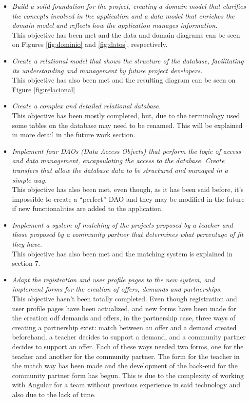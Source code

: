 \documentclass[11pt]{book}
\begin{document}
\begin{itemize}
	\item \emph{Build a solid foundation for the project, creating a domain model that clarifies the concepts involved in the application and a data model that enriches the domain model and reflects how the application manages information.}\\
This objective has been met and the data and domain diagrams can be seen on Figures  \ref{fig:dominio} and \ref{fig:datos}, respectively.
	\item \emph{Create a relational model that shows the structure of the database, facilitating its understanding and management by future project developers.}\\
This objective has also been met and the resulting diagram can be seen on Figure \ref{fig:relacional}
	\item \emph{Create a complex and detailed relational database.}\\
This objective has been mostly completed, but, due to the terminology used some tables on the database may need to be renamed. This will be explained in more detail in the future work section.
	\item \emph{Implement four DAOs (Data Access Objects) that perform the logic of access and data management, encapsulating the access to the database. Create transfers that allow the database data to be structured and managed in a simple way.}\\
This objective has also been met, even though, as it has been said before, it's impossible to create a ``perfect'' DAO and they may be modified in the future if new functionalities are added to the application.
	\item \emph{Implement a system of matching of the projects proposed by a teacher and those proposed by a community partner that determines what percentage of fit they have.}\\
This objective has also been met and the matching system is explained in section 7.
	\item \emph{ Adapt the registration and user profile pages to the new system, and implement forms for the creation of offers, demands and partnerships.}\\
This objective hasn't been totally completed. Even though registration and user profile pages have been actualized, and new forms have been made for the creation odf demands and offers, in the partnership case, three ways of creating a partnership exist: match between an offer and a demand created beforehand, a teacher decides to support a demand, and a community partner decides to support an offer. Each of these ways needed two forms, one for the  teacher and another for the community partner. The form for the teacher in the match way has been made and the development of the back-end for the community partner form has begun. This is due to the complexity of working with Angular for a team without previous experience in said technology and also due to the lack of time.

\end{itemize}
\end{document}

